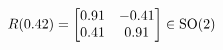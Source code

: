 \documentclass[preview]{standalone}
\begin{document}
\begin{align*}
\special{dvisvgm:raw <g id='unique000'>}R(0.42) = \begin{bmatrix} 0.91 & -0.41 \\ 0.41 & 0.91 \end{bmatrix} \in \text{SO}(2)\special{dvisvgm:raw </g>}
\end{align*}
\end{document}
